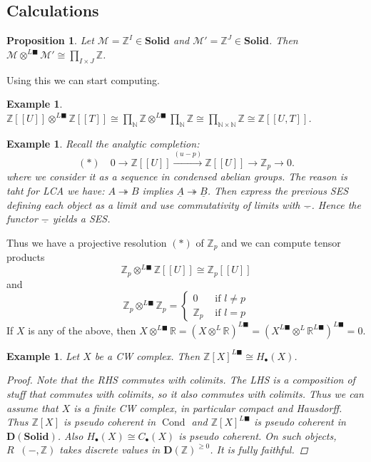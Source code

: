 \documentclass[12pt]{article}
\theoremstyle{darkgreentheorem}
\newtheorem{prop}[thm]{Proposition}
\theoremstyle{darkbluedefinition}
\theoremstyle{darkredexample}
\newtheorem{exa}[thm]{Example}
\theoremstyle{remark}
\newcommand{\N}{\mathbb{N}}
\newcommand{\Z}{\mathbb{Z}}
\newcommand{\R}{\mathbb{R}}
\newcommand{\1}{\mathbbm{1}}
\newcommand{\D}{\mathbf{D}}
\newcommand{\Solid}{\mathbf{Solid}}
\newcommand{\M}{\mathcal{M}}
\DeclareMathOperator{\Cond}{Cond}
\DeclareMathOperator{\ihom}{\underline{Hom}}
\renewcommand{\u}[1]{\underline{#1}}
\newcommand{\ot}{\otimes}
\newcommand{\tms}{\times}
\newcommand{\epi}{\twoheadrightarrow}
\newcommand{\dsolid}{^{L\blacksquare}}
\begin{document}
\subsection{Calculations}

\begin{prop}
    Let $\M=\Z^{I}\in \Solid$ and $\M'=\Z^{J}\in \Solid$.
    Then $\M\ot\dsolid \M'\cong \prod_{I\tms J} \Z $.
\end{prop}

Using this we can start computing.

\begin{exa}
    $\Z[[U]]\ot\dsolid \Z[[T]]\cong \prod_{\N}\Z\ot\dsolid \prod_{\N}\Z \cong \prod_{\N\tms\N}\Z\cong \Z[[U,T]]$.
\end{exa}

\begin{exa}
    Recall the analytic completion:
    \[ (*) \quad 0\to \Z[[U]]\xrightarrow{(u-p)}\Z[[U]]\to \Z_{p}\to 0.\]
    where we consider it as a sequence in condensed abelian groups.
    The reason is taht for LCA we have: $A\epi B$ implies $\u{A}\epi \u{B}$.
    Then express the previous SES defining each object as a limit and use commutativity of limits with $\u{-}$.
    Hence the functor $\u{-}$ yields a SES.
\end{exa}

Thus we have a projective resolution $(*)$ of $\Z_{p}$ and we can compute tensor products
\[ \Z_{p}\ot\dsolid \Z[[U]] \cong \Z_{p}[[U]] \]
and
\[ \Z_{p}\ot \dsolid \Z_{p}=\begin{cases} 0 &\text{ if } l\neq p \\ \Z_{p} & \text{ if } l=p\end{cases} \]
If $X$ is any of the above, then $X\ot\dsolid \R=(X\ot^{L}\R)\dsolid=(X\dsolid\ot^{L}\R\dsolid)\dsolid=0$.

\begin{exa}
    Let $X$ be a CW complex.
    Then $\Z[X]\dsolid \cong H_{\bullet}(X)$.
    \begin{proof}
	Note that the RHS commutes with colimits.
	The LHS is a composition of stuff that commutes with colimits, so it also commutes with colimits.
	Thus we can assume that $X$ is a finite CW complex, in particular compact and Hausdorff.
	Thus $\Z[X]$ is pseudo coherent in $\Cond$ and $\Z[X]\dsolid$ is pseudo coherent in $\D(\Solid)$.
	Also $H_{\bullet}(X)\cong C_{\bullet}(X)$ is pseudo coherent.
	On such objects, $R\ihom(-,\Z)$ takes discrete values in $\D(\Z)^{\geqslant 0}$.
	It is fully faithful.
    \end{proof}
\end{exa}
\end{document}
